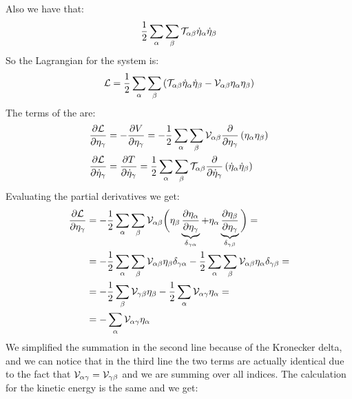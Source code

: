 Also we have that:
\begin{equation}
    \dfrac{1}{2}\displaystyle\sum_{\alpha}\displaystyle\sum_{\beta}\mathcal{T}_{\alpha \beta}\dot{\eta}_{\alpha}\dot{\eta}_{\beta}
\end{equation}
So the Lagrangian for the system is:
\begin{equation}
    \mathcal{L} = \dfrac{1}{2}\displaystyle\sum_{\alpha}\displaystyle\sum_{\beta}\left(\mathcal{T}_{\alpha \beta}\dot{\eta}_{\alpha}\dot{\eta}_{\beta} - \mathcal{V}_{\alpha \beta}\eta_{\alpha}\eta_{\beta}\right)
\end{equation}
The terms of the \eleref\;are:
\begin{equation}
    \begin{split}
        \pdv{\lagr}{\eta_{\gamma}} &= -\pdv{V}{\eta_{\gamma}} = -\dfrac{1}{2}\bigsum_{\alpha}\bigsum_{\beta}\Velegant_{\alpha \beta} \pdv{}{\eta_{\gamma}}\brackets{\eta_{\alpha}\eta_{\beta}}\\
        \pdv{\lagr}{\dot{\eta}_{\gamma}} &= \pdv{T}{\dot{\eta}_{\gamma}} = \dfrac{1}{2}\bigsum_{\alpha}\bigsum_{\beta}\Telegant_{\alpha \beta}\pdv{}{\dot{\eta}_{\gamma}}\brackets{\dot{\eta}_{\alpha}\dot{\eta}_{\beta}}
    \end{split}
\end{equation}
Evaluating the partial derivatives we get:
\begin{equation}
    \begin{split}
        \pdv{\lagr}{\eta_{\gamma}} &= -\dfrac{1}{2}\bigsum_{\alpha}\bigsum_{\beta}\Velegant_{\alpha \beta} \bbrackets{\eta_{\beta}\underbrace{\pdv{\eta_{\alpha}}{\eta_{\gamma}}}_{\delta_{\gamma \alpha}} + \eta_{\alpha}\underbrace{\pdv{\eta_{\beta}}{\eta_{\gamma}}}_{\delta_{\gamma \beta}}} =\\
        &= -\dfrac{1}{2}\bigsum_{\alpha}\bigsum_{\beta}\Velegant_{\alpha \beta} \eta_{\beta}\delta_{\gamma \alpha} - \dfrac{1}{2}\bigsum_{\alpha}\bigsum_{\beta}\Velegant_{\alpha \beta} \eta_{\alpha}\delta_{\gamma \beta} = \\
        &= -\dfrac{1}{2}\bigsum_{\beta}\Velegant_{\gamma \beta} \eta_{\beta} - \dfrac{1}{2}\bigsum_{\alpha}\Velegant_{\alpha \gamma} \eta_{\alpha} =\\
        &= -\bigsum_{\alpha}\Velegant_{\alpha \gamma} \eta_{\alpha}
    \end{split}
\end{equation}
We simplified the summation in the second line because of the Kronecker delta, and we can notice that in the third line the two terms are actually identical due to the fact that $\mathcal{V}_{\alpha \gamma} = \mathcal{V}_{\gamma \beta}$ and we are summing over all indices. The calculation for the kinetic energy is the same and we get:
